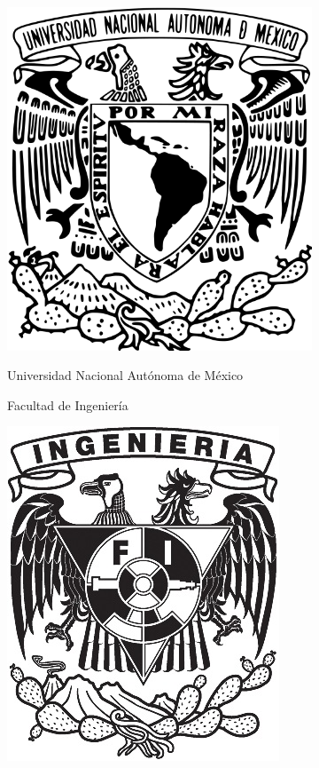 \documentclass[letterpaper, 11pt]{article}
\begin{document}
	
	\begin{figure}[H] %
		\begin{subfigure}{0.2\textwidth}
			\includegraphics[scale = 0.16 ,left]{Imagenes/Portada/Escudo_UNAM.png}
		\end{subfigure}
		\hfill
		\begin{subfigure}{0.5\textwidth}
			\centering
			{\fontsize{15}{15} \selectfont Universidad Nacional Autónoma de México}
			
			\vspace{6mm}
			
			{\fontsize{15}{15} \selectfont Facultad de Ingeniería}
		\end{subfigure}
		\hfill
		\begin{subfigure}{0.2\textwidth}
			\includegraphics[scale = 1, right]{Imagenes/Portada/Escudo_FI.jpg}
		\end{subfigure}
		

\end{figure}
\end{document}
